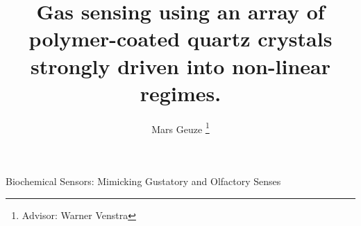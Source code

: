 \documentclass[12pt]{article}
\begin{document}
	\title{Gas sensing using an array of polymer-coated quartz crystals strongly driven into non-linear regimes.}
	\author{Mars Geuze
	\thanks{Advisor: Warner Venstra}}
	\maketitle



\tableofcontents






Biochemical Sensors: Mimicking Gustatory and Olfactory Senses


\end{document}

